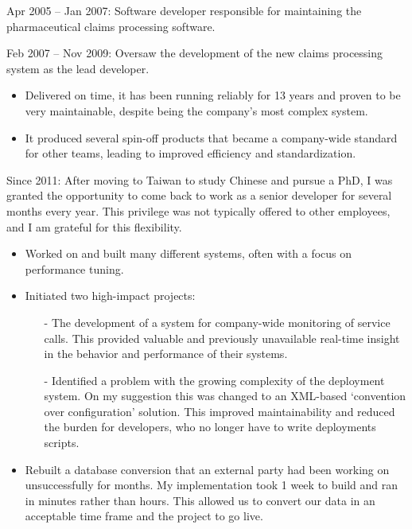 \documentclass[10pt,a4paper]{../altacv}
\begin{document}
Apr 2005 -- Jan 2007: Software developer responsible for maintaining the pharmaceutical claims processing software.

\medskip

Feb 2007 -- Nov 2009: Oversaw the development of the new claims processing system as the lead developer.

\medskip

\begin{itemize}
	\item Delivered on time, it has been running reliably for 13 years and proven to be very maintainable, despite being the company's most complex system.
	\item It produced several spin-off products that became a company-wide standard for other teams, leading to improved efficiency and standardization.
\end{itemize}

\medskip

Since 2011: After moving to Taiwan to study Chinese and pursue a PhD, I was granted the opportunity to come back to work as a senior developer for several months every year. This privilege was not typically offered to other employees, and I am grateful for this flexibility.


\medskip

\begin{itemize}
	\item Worked on and built many different systems, often with a focus on performance tuning.
	\item Initiated two high-impact projects:
	\begin{itemize}
		\item[-] The development of a system for company-wide monitoring of service calls. This provided valuable and previously unavailable real-time insight in the behavior and performance of their systems.
		\item[-] Identified a problem with the growing complexity of the deployment system. On my suggestion this was changed to an XML-based ‘convention over configuration' solution. This improved maintainability and reduced the burden for developers, who no longer have to write deployments scripts.
	\end{itemize}
	\item Rebuilt a database conversion that an external party had been working on unsuccessfully for months. My implementation took 1 week to build and ran in minutes rather than hours. This allowed us to convert our data in an acceptable time frame and the project to go live.
\end{itemize}
\end{document}
